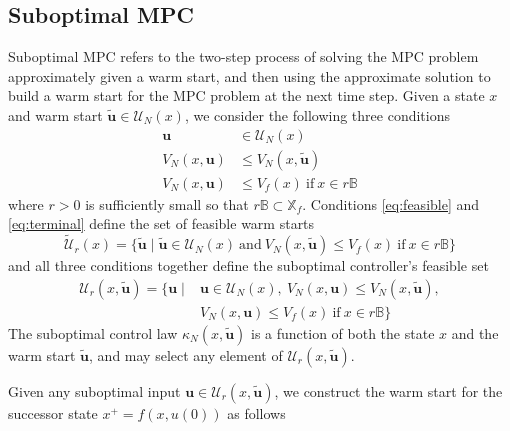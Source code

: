 \documentclass{article}
\begin{document}
\subsection{Suboptimal MPC}
Suboptimal MPC refers to the two-step process of solving the MPC problem
approximately given a warm start, and then using the approximate solution to build a warm start 
for the MPC problem at the next time step. Given a state $x$ and warm start 
$\tilde{\mathbf{u}} \in \mathcal{U}_N(x)$, we consider the following three conditions
\begin{align}
\label{eq:feasible}
\mathbf{u} &\in \mathcal{U}_N(x) \\
\label{eq:improved}
V_N(x,\mathbf{u}) &\leq V_N(x,\tilde{\mathbf{u}})  \\
\label{eq:terminal}
V_N(x,\mathbf{u}) &\leq V_f(x) \ \text{if} \ x \in r\mathbb{B}
\end{align}
where $r>0$ is sufficiently small so that $r\mathbb{B} \subset \mathbb{X}_f$. Conditions 
\eqref{eq:feasible} and \eqref{eq:terminal} define the set of feasible warm starts
\begin{equation}
\label{eq:feaswarm}
\tilde{\mathcal{U}}_r(x) = \{ \tilde{\mathbf{u}} \mid \tilde{\mathbf{u}} \in \mathcal{U}_N(x) \ 
\text{and} \ V_N(x,\tilde{\mathbf{u}}) \leq V_f(x) \ \text{if} \ x \in r\mathbb{B} \}
\end{equation}
and all three conditions together define the suboptimal controller's feasible set
\begin{align}
\label{eq:subcontrol}
\mathcal{U}_r(x,\tilde{\mathbf{u}}) 
= \{ \mathbf{u} \mid &\mathbf{u} \in \mathcal{U}_N(x), \
V_N(x,\mathbf{u}) \leq V_N(x,\tilde{\mathbf{u}}), \nonumber \\
& V_N(x,\mathbf{u}) \leq V_f(x) \ \text{if} \ x \in r\mathbb{B} \}
\end{align}
The
suboptimal control law $\kappa_N(x,\tilde{\mathbf{u}})$ is a function of both the state $x$ and the
warm start $\tilde{\mathbf{u}}$, and may select any element of $\mathcal{U}_r(x,\tilde{\mathbf{u}})$.

Given any suboptimal input $\mathbf{u} \in \mathcal{U}_r(x,\tilde{\mathbf{u}})$,
we construct the warm start for the successor state $x^+=f(x,u(0))$ as follows
\end{document}
